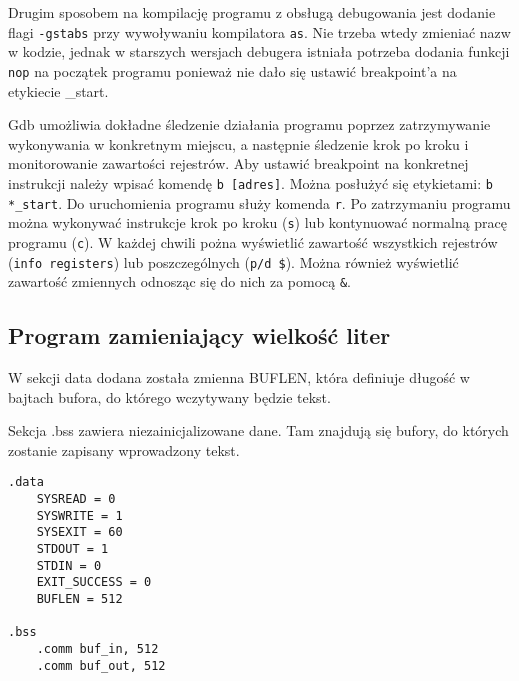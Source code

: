 \documentclass[polish, 11pt]{article}
\begin{document}
		Drugim sposobem na kompilację programu z obsługą debugowania jest dodanie flagi \texttt{-gstabs}
		przy wywoływaniu kompilatora \texttt{as}. Nie trzeba wtedy zmieniać nazw w kodzie,
		jednak w starszych wersjach debugera istniała potrzeba dodania funkcji \texttt{nop}
		na początek programu ponieważ nie dało się ustawić breakpoint'a na etykiecie \_start.
		
		Gdb umożliwia dokładne śledzenie działania programu poprzez zatrzymywanie wykonywania w konkretnym miejscu,
		a następnie śledzenie krok po kroku i monitorowanie zawartości rejestrów.
		Aby ustawić breakpoint na konkretnej instrukcji należy wpisać komendę \texttt{b [adres]}.
		Można posłużyć się etykietami: \texttt{b *\_start}. Do uruchomienia programu służy komenda \texttt{r}.
		Po zatrzymaniu programu można wykonywać instrukcje krok po kroku (\texttt{s})
		lub kontynuować normalną pracę programu (\texttt{c}).
		W każdej chwili pożna wyświetlić zawartość wszystkich rejestrów (\texttt{info registers})
		lub poszczególnych (\texttt{p/d \$<nazwa rejestru>}).
		Można również wyświetlić zawartość zmiennych odnosząc się do nich za pomocą \texttt{\&<nazwa zmiennej>}.
	
	\subsection{Program zamieniający wielkość liter}
		\begin{minipage}{.5\textwidth}
		W sekcji data dodana została zmienna BUFLEN, która definiuje długość w bajtach bufora,
		do którego wczytywany będzie tekst.
		
		Sekcja .bss zawiera niezainicjalizowane dane.
		Tam znajdują się bufory, do których zostanie zapisany wprowadzony tekst.
		\end{minipage}%
		\hspace{1cm}
		\begin{minipage}{.5\textwidth}
			\begin{lstlisting}
.data
    SYSREAD = 0
    SYSWRITE = 1
    SYSEXIT = 60
    STDOUT = 1
    STDIN = 0
    EXIT_SUCCESS = 0
    BUFLEN = 512

.bss
    .comm buf_in, 512
    .comm buf_out, 512
			\end{lstlisting}
		\end{minipage}
		
\end{document}
